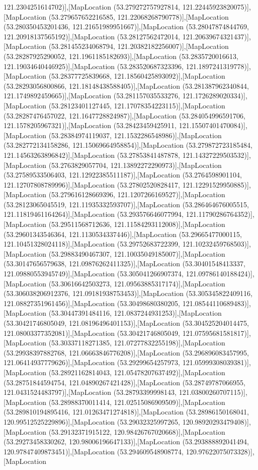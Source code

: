 121.2304251614702)],[MapLocation (53.279272757927814, 121.22445923820075)],[MapLocation (53.279657652216585, 121.22068268790778)],[MapLocation (53.280350453201436, 121.21651989951667)],[MapLocation (53.28047874844769, 121.20918137565192)],[MapLocation (53.28127562472014, 121.20639674321437)],[MapLocation (53.281455234068794, 121.20382182256007)],[MapLocation (53.28287925290052, 121.1961185182693)],[MapLocation (53.2835720016613, 121.19034640446925)],[MapLocation (53.283520687323396, 121.1897241319778)],[MapLocation (53.28377725839668, 121.18560425893092)],[MapLocation (53.28293056800866, 121.18148438588405)],[MapLocation (53.281387962340844, 121.1749892459665)],[MapLocation (53.281157035533276, 121.1726289020334)],[MapLocation (53.28123401127445, 121.17078354223115)],[MapLocation (53.28287476457022, 121.1647728824987)],[MapLocation (53.284054996591706, 121.1578205967321)],[MapLocation (53.28423459425911, 121.15507401470084)],[MapLocation (53.28384974119037, 121.1532286548986)],[MapLocation (53.282772134158286, 121.15069664958854)],[MapLocation (53.279872723185484, 121.14563263896842)],[MapLocation (53.27853841487878, 121.14327229503532)],[MapLocation (53.2763829057704, 121.13892272290973)],[MapLocation (53.27589533506403, 121.12922385511187)],[MapLocation (53.2764598901104, 121.12707808789996)],[MapLocation (53.27802520828417, 121.12291529950885)],[MapLocation (53.279616128669396, 121.1207266169527)],[MapLocation (53.28123065045519, 121.11935332593707)],[MapLocation (53.286464676005515, 121.11819461164264)],[MapLocation (53.293576646077994, 121.11790286764352)],[MapLocation (53.29511568712636, 121.11584293112008)],[MapLocation (53.29601343546364, 121.1130534337446)],[MapLocation (53.29665477000115, 121.10451328024118)],[MapLocation (53.29752683722399, 121.10232459768503)],[MapLocation (53.29883490467307, 121.10035049185007)],[MapLocation (53.30147656579638, 121.09876262411325)],[MapLocation (53.30401548413337, 121.09880553945749)],[MapLocation (53.305041266907374, 121.09786140188424)],[MapLocation (53.30616642503273, 121.09563885317174)],[MapLocation (53.306038206912376, 121.09181938753453)],[MapLocation (53.305345822409116, 121.08827351961456)],[MapLocation (53.30498680380205, 121.08544110689483)],[MapLocation (53.30447391484116, 121.0837244931253)],[MapLocation (53.30421746805049, 121.08196496401153)],[MapLocation (53.304525204014475, 121.08003377352081)],[MapLocation (53.30421746805049, 121.07595681581817)],[MapLocation (53.30337118271385, 121.07277832255198)],[MapLocation (53.29938397882768, 121.06663846776208)],[MapLocation (53.296896083457995, 121.06414937779626)],[MapLocation (53.29299654257973, 121.05999308039381)],[MapLocation (53.28921162814043, 121.05478207637492)],[MapLocation (53.28751844594754, 121.04890267421428)],[MapLocation (53.28749787066955, 121.0431524483797)],[MapLocation (53.28793399998143, 121.03800260707115)],[MapLocation (53.28988370011414, 121.02515086909509)],[MapLocation (53.289810194895416, 121.01263471274818)],[MapLocation (53.28986150168041, 120.99512525229896)],[MapLocation (53.29032325997265, 120.98920293479408)],[MapLocation (53.29132371915122, 120.98426767020668)],[MapLocation (53.29273458330262, 120.98006196647133)],[MapLocation (53.293888892041494, 120.97847409873451)],[MapLocation (53.294609548908774, 120.97622075073328)],[MapLocation 